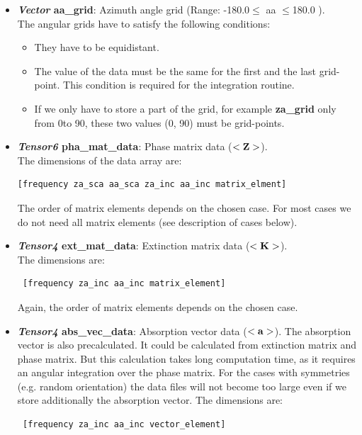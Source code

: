 \begin{itemize}
\item {\bf {\sl Vector} aa\_grid}: Azimuth angle grid (Range: -180.0\degree $\le$ aa $\le$180.0 \degree).\\
  \vspace*{1ex} The angular grids have to satisfy the following
  conditions:
\begin{itemize}
\item They have to be equidistant.
\item The value of the data must be the same for the first and the
  last grid-point. This condition is required for the integration
  routine.
\item If we only have to store a part of the grid, for example {\bf
    za\_grid} only from 0\degree to 90\degree, these two values (0\degree, 90\degree) must be
  grid-points.
\end{itemize}



\item {\bf {\sl Tensor6} pha\_mat\_data}: Phase matrix data ($<{\bf Z}>$). \\
  The dimensions of the data array are:
 \hspace*{2ex}\begin{verbatim}[frequency za_sca aa_sca za_inc aa_inc matrix_elment]\end{verbatim} 
The order of matrix elements depends on
the chosen case.  For most cases we do not need all matrix
elements (see description of cases below).

\item {\bf {\sl Tensor4} ext\_mat\_data}: Extinction matrix data ($<{\bf K}>$). \\
  The dimensions are:
 \hspace*{2ex}\begin{verbatim} [frequency za_inc aa_inc matrix_element] \end{verbatim}
Again, the order of matrix elements depends on the chosen case.

\item {\bf {\sl Tensor4} abs\_vec\_data}: Absorption vector data ($<{\bf
    a}>$).  The absorption vector is also precalculated. It could be calculated from extinction matrix and phase matrix. But this calculation takes long
  computation time, as it requires an angular integration over
  the phase matrix.  For the cases with symmetries (e.g. random
  orientation) the data files will not become too large even if we
  store additionally the absorption vector. The dimensions are:
  \hspace*{2ex}\begin{verbatim} [frequency za_inc aa_inc vector_element] \end{verbatim}

\end{itemize}


